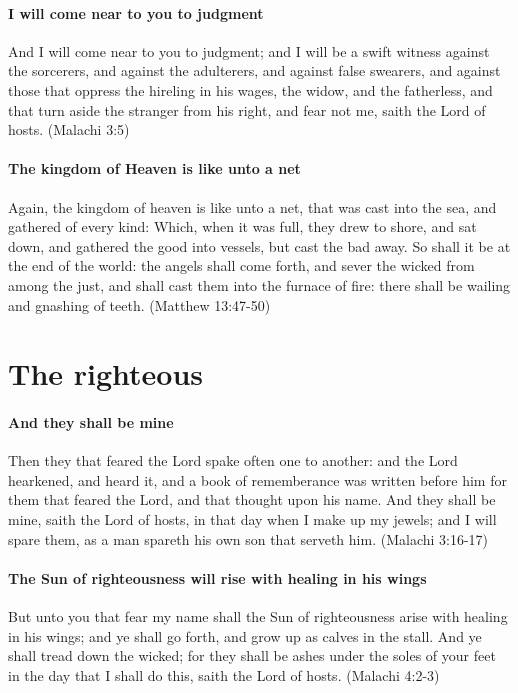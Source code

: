 \paragraph{I will come near to you to judgment}
And I will come near to you to judgment; and I will be a swift witness against the sorcerers, and against the adulterers, and against false swearers, and against those that oppress the hireling in his wages, the widow, and the fatherless, and that turn aside the stranger from his right, and fear not me, saith the Lord of hosts. (Malachi 3:5)

\paragraph{The kingdom of Heaven is like unto a net}
Again, the kingdom of heaven is like unto a net, that was cast into the sea, and gathered of every kind: Which, when it was full, they drew to shore, and sat down, and gathered the good into vessels, but cast the bad away. So shall it be at the end of the world: the angels shall come forth, and sever the wicked from among the just, and shall cast them into the furnace of fire: there shall be wailing and gnashing of teeth. (Matthew 13:47-50)

\section{The righteous}

\paragraph{And they shall be mine}
Then they that feared the Lord spake often one to another: and the Lord hearkened, and heard it, and a book of rememberance was written before him for them that feared the Lord, and that thought upon his name. And they shall be mine, saith the Lord of hosts, in that day when I make up my jewels; and I will spare them, as a man spareth his own son that serveth him. (Malachi 3:16-17)

\paragraph{The Sun of righteousness will rise with healing in his wings}
But unto you that fear my name shall the Sun of righteousness arise with healing in his wings; and ye shall go forth, and grow up as calves in the stall. And ye shall tread down the wicked; for they shall be ashes under the soles of your feet in the day that I shall do this, saith the Lord of hosts. (Malachi 4:2-3)

